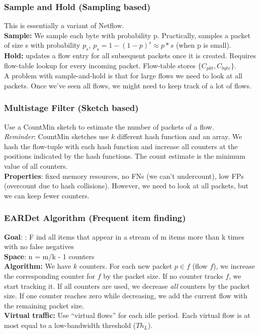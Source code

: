 \subsubsection{Sample and Hold (Sampling based)}

This is essentially a variant of Netflow.\\
\textbf{Sample:} We sample each byte with probability p. Practically, samples a packet of size s with probability $p_s$, $p_s = 1-(1-p)^s \approx p*s$ (when p is small).\\
\textbf{Hold:} updates a flow entry for all subsequent packets once it is created. Requires flow-table lookup for every incoming packet. Flow-table stores $\{C_{pkt}, C_{byte}\}$.\\

A problem with sample-and-hold is that for large flows we need to look at all packets. Once we've seen all flows, we might need to keep track of a lot of flows.

\subsubsection{Multistage Filter (Sketch based)}

Use a CountMin sketch to estimate the number of packets of a flow.\\
\textit{Reminder}: CountMin sketches use $k$ different hash function and an array. We hash the flow-tuple with each hash function and increase all counters at the positions indicated by the hash functions. The count estimate is the minimum value of all counters.\\
\textbf{Properties}: fixed memory resources, no FNs (we can't undercount), low FPs (overcount due to hash collisions). However, we need to look at all packets, but we can keep fewer counters.

\subsubsection{EARDet Algorithm (Frequent item finding)}

\textbf{Goal}: : F ind all items that appear in a stream of m items more than k times with no false negatives\\
\textbf{Space}: n = m/k - 1 counters\\
\textbf{Algorithm:} We have $k$ counters. For each new packet $p \in f$ (flow $f$), we increase the corresponding counter for $f$ by the packet size. If no counter tracks $f$, we start tracking it. If all counters are used, we decrease \textit{all} counters by the packet size. If one counter reaches zero while decreasing, we add the current flow with the remaining packet size.\\
\textbf{Virtual traffic:} Use “virtual flows” for each idle period. Each virtual flow is at most equal to a low-bandwidth threshold ($Th_L$).\\

